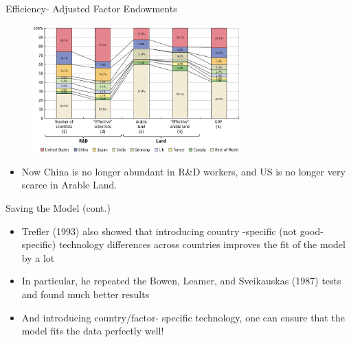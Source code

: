 \documentclass[10pt,hyperref={CJKbookmarks=true},xcolor=dvipsnames,aspectratio=169]{beamer}
\begin{document}
\begin{frame}{Efficiency- Adjusted Factor Endowments}


\begin{figure}


\begin{centering}
\includegraphics[width=8cm]{fig/ho/lec5-19}
\par\end{centering}

\end{figure}

\begin{itemize}
\item Now China is no longer abundant in R\&D workers, and US is no longer
very scarce in Arable Land. 
\end{itemize}
\end{frame}

\begin{frame}{Saving the Model (cont.) }

\begin{itemize}
\item Trefler (1993) also showed that introducing country -specific (not
good- specific) technology differences across countries improves the
fit of the model by a lot 
\item In particular, he repeated the Bowen, Leamer, and Sveikauskas (1987)
tests and found much better results 
\item And introducing country/factor- specific technology, one can ensure
that the model fits the data perfectly well! 
\end{itemize}
\end{frame}
\end{document}
